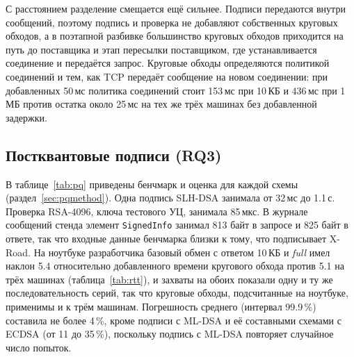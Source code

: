 \documentclass[conference,a4paper]{IEEEtran}
\newcommand{\newtext}[1]{{\color{blue}#1}}
\begin{document}
{\color{blue}С расстоянием разделение смещается ещё сильнее. Подписи передаются внутри сообщений, поэтому подпись и
проверка не добавляют собственных круговых обходов, а в поэтапной разбивке большинство круговых обходов приходится на
путь до поставщика и этап пересылки поставщиком, где устанавливается соединение и
передаётся запрос. Круговые обходы определяются политикой соединений и тем, как TCP передаёт
сообщение на новом соединении: при добавленных 50\,мс политика соединений стоит 153\,мс при 10\,КБ и
436\,мс при 1\,МБ против остатка около 25\,мс на тех же трёх машинах без добавленной задержки.

\subsection{\newtext{Постквантовые подписи (RQ3)}}\label{sec:rq3}

\newtext{В таблице~\ref{tab:pq} приведены бенчмарк и оценка для каждой схемы
(раздел~\ref{sec:pqmethod}). Одна подпись SLH-DSA занимала от 32\,мс до 1.1\,с. Проверка
RSA-4096, ключа тестового УЦ, занимала 85\,мкс. В журнале сообщений стенда
элемент \texttt{SignedInfo} занимал 813 байт в запросе и 825 байт в ответе, так что входные данные
бенчмарка близки к тому, что подписывает X-Road. На ноутбуке разработчика базовый обмен с
ответом 10\,КБ и \emph{full} имел наклон 5.4 относительно добавленного времени кругового обхода против 5.1 на
трёх машинах (таблица~\ref{tab:rtt}), и захваты на обоих показали одну и ту же последовательность
серий, так что круговые обходы, подсчитанные на ноутбуке, применимы и к трём машинам. Погрешность среднего (интервал 99.9\,\%) составила не
более 4\,\%, кроме подписи с ML-DSA и её составными схемами с ECDSA (от 11 до 35\,\%), поскольку подпись
с ML-DSA повторяет случайное число попыток.}

}
\end{document}

